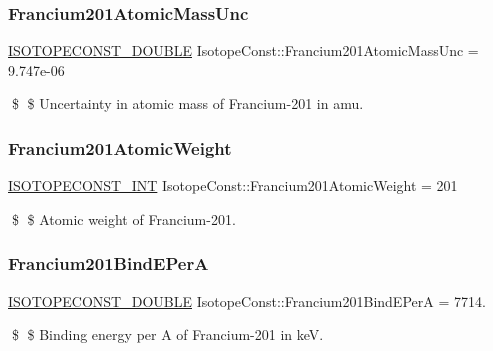 \subsubsection{\texorpdfstring{Francium201\+Atomic\+Mass\+Unc}{Francium201AtomicMassUnc}}
{\footnotesize\ttfamily \mbox{\hyperlink{group___isotope_const-_macros_ga8f45a7272ce02c0b4c65c44636ed719a}{I\+S\+O\+T\+O\+P\+E\+C\+O\+N\+S\+T\+\_\+\+D\+O\+U\+B\+LE}} Isotope\+Const\+::\+Francium201\+Atomic\+Mass\+Unc = 9.\+747e-\/06}

\$ \$ Uncertainty in atomic mass of Francium-\/201 in amu. \mbox{\label{group___isotope_const-_francium-_fr201_gaa82729b241877c0d59be0ab498f624e1}} 
\subsubsection{\texorpdfstring{Francium201\+Atomic\+Weight}{Francium201AtomicWeight}}
{\footnotesize\ttfamily \mbox{\hyperlink{group___isotope_const-_macros_ga5f18360b3e99483a35c32d789e62621c}{I\+S\+O\+T\+O\+P\+E\+C\+O\+N\+S\+T\+\_\+\+I\+NT}} Isotope\+Const\+::\+Francium201\+Atomic\+Weight = 201}

\$ \$ Atomic weight of Francium-\/201. \mbox{\label{group___isotope_const-_francium-_fr201_gac3f482856d1e5dbf1f87ba2af2510138}} 
\subsubsection{\texorpdfstring{Francium201\+Bind\+E\+PerA}{Francium201BindEPerA}}
{\footnotesize\ttfamily \mbox{\hyperlink{group___isotope_const-_macros_ga8f45a7272ce02c0b4c65c44636ed719a}{I\+S\+O\+T\+O\+P\+E\+C\+O\+N\+S\+T\+\_\+\+D\+O\+U\+B\+LE}} Isotope\+Const\+::\+Francium201\+Bind\+E\+PerA = 7714.}

\$ \$ Binding energy per A of Francium-\/201 in keV. \mbox{\label{group___isotope_const-_francium-_fr201_ga6731eca96d446269ec4f21818670abe0}} 
